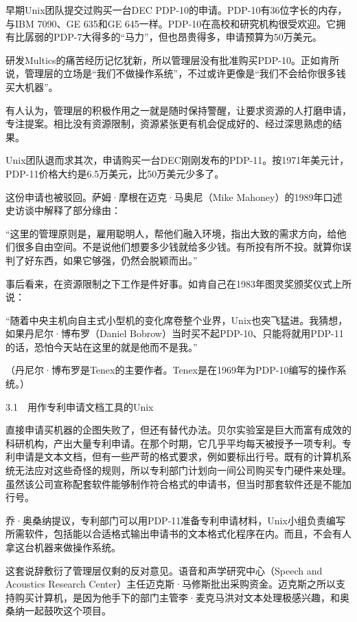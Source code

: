 \documentclass[a4paper,12pt,UTF8,twoside]{ctexbook}
\begin{document}
{早期Unix团队提交过购买一台DEC PDP-10的申请。PDP-10有36位字长的内存，与IBM 7090、GE 635和GE 645一样。PDP-10在高校和研究机构很受欢迎。它拥有比孱弱的PDP-7大得多的“马力”，但也昂贵得多，申请预算为50万美元。

研发Multics的痛苦经历记忆犹新，所以管理层没有批准购买PDP-10。正如肯所说，管理层的立场是“我们不做操作系统”，不过或许更像是“我们不会给你很多钱买大机器”。

有人认为，管理层的积极作用之一就是随时保持警醒，让要求资源的人打磨申请，专注提案。相比没有资源限制，资源紧张更有机会促成好的、经过深思熟虑的结果。

Unix团队退而求其次，申请购买一台DEC刚刚发布的PDP-11。按1971年美元计，PDP-11价格大约是6.5万美元，比50万美元少多了。

这份申请也被驳回。萨姆·摩根在迈克·马奥尼（Mike Mahoney）的1989年口述史访谈中解释了部分缘由：

“这里的管理原则是，雇用聪明人，帮他们融入环境，指出大致的需求方向，给他们很多自由空间。不是说他们想要多少钱就给多少钱。有所投有所不投。就算你误判了好东西，如果它够强，仍然会脱颖而出。”



事后看来，在资源限制之下工作是件好事。如肯自己在1983年图灵奖颁奖仪式上所说：

“随着中央主机向自主式小型机的变化席卷整个业界，Unix也突飞猛进。我猜想，如果丹尼尔·博布罗（Daniel Bobrow）当时买不起PDP-10、只能将就用PDP-11的话，恐怕今天站在这里的就是他而不是我。”



（丹尼尔·博布罗是Tenex的主要作者。Tenex是在1969年为PDP-10编写的操作系统。）





3.1　用作专利申请文档工具的Unix


直接申请买机器的企图失败了，但还有替代办法。贝尔实验室是巨大而富有成效的科研机构，产出大量专利申请。在那个时期，它几乎平均每天被授予一项专利。专利申请是文本文档，但有一些严苛的格式要求，例如要标出行号。既有的计算机系统无法应对这些奇怪的规则，所以专利部门计划向一间公司购买专门硬件来处理。虽然该公司宣称配套软件能够制作符合格式的申请书，但当时那套软件还是不能加行号。

乔·奥桑纳提议，专利部门可以用PDP-11准备专利申请材料，Unix小组负责编写所需软件，包括能以合适格式输出申请书的文本格式化程序在内。而且，不会有人拿这台机器来做操作系统。

这套说辞敷衍了管理层仅剩的反对意见。语音和声学研究中心（Speech and Acoustics Research Center）主任迈克斯·马修斯批出采购资金。迈克斯之所以支持购买计算机，是因为他手下的部门主管李·麦克马洪对文本处理极感兴趣，和奥桑纳一起鼓吹这个项目。

}
\end{document}
